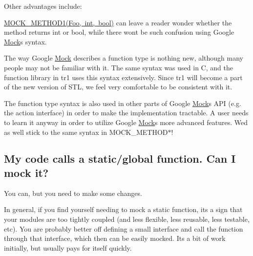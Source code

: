 Other advantages include\+:
\begin{DoxyEnumerate}
\item {\ttfamily \mbox{\hyperlink{_obj__test_2lib_2googletest-release-1_88_81_2googlemock_2include_2gmock_2gmock-generated-function-mockers_8h_ac49d366be035ee87b73264a29059cdc7}{M\+O\+C\+K\+\_\+\+M\+E\+T\+H\+O\+D1(\+Foo, int, bool)}}} can leave a reader wonder whether the method returns {\ttfamily int} or {\ttfamily bool}, while there won\textquotesingle{}t be such confusion using Google \mbox{\hyperlink{class_mock}{Mock}}\textquotesingle{}s syntax.
\end{DoxyEnumerate}
\begin{DoxyEnumerate}
\item The way Google \mbox{\hyperlink{class_mock}{Mock}} describes a function type is nothing new, although many people may not be familiar with it. The same syntax was used in C, and the {\ttfamily function} library in {\ttfamily tr1} uses this syntax extensively. Since {\ttfamily tr1} will become a part of the new version of S\+TL, we feel very comfortable to be consistent with it.
\end{DoxyEnumerate}
\begin{DoxyEnumerate}
\item The function type syntax is also used in other parts of Google \mbox{\hyperlink{class_mock}{Mock}}\textquotesingle{}s A\+PI (e.\+g. the action interface) in order to make the implementation tractable. A user needs to learn it anyway in order to utilize Google \mbox{\hyperlink{class_mock}{Mock}}\textquotesingle{}s more advanced features. We\textquotesingle{}d as well stick to the same syntax in {\ttfamily M\+O\+C\+K\+\_\+\+M\+E\+T\+H\+O\+D$\ast$}!
\end{DoxyEnumerate}

\subsection*{My code calls a static/global function. Can I mock it?}

You can, but you need to make some changes.

In general, if you find yourself needing to mock a static function, it\textquotesingle{}s a sign that your modules are too tightly coupled (and less flexible, less reusable, less testable, etc). You are probably better off defining a small interface and call the function through that interface, which then can be easily mocked. It\textquotesingle{}s a bit of work initially, but usually pays for itself quickly.

